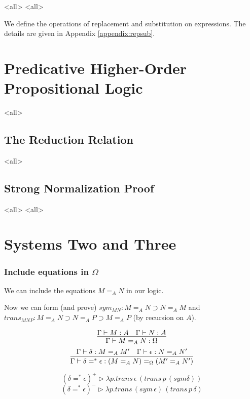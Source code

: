 
\mode<all>{}
\mode<all>{}

We define the operations of replacement and substitution on
expressions.  The details are given in Appendix \ref{appendix:repsub}.








\section{Predicative Higher-Order Propositional Logic}


\mode<all>{}

\subsection{The Reduction Relation}

\mode<all>{}

\subsection{Strong Normalization Proof}

\mode<all>{}
\mode<all>{}

\section{Systems Two and Three}

\begin{frame}
\frametitle{Include equations in $\Omega$}

We can include the equations $M =_A N$ in our logic.

Now we can form (and prove) $sym_{MN} : M =_A N \supset N =_A M$ and $trans_{MNP} : M =_A N \supset N =_A P \supset M =_A P$ (by recursion on $A$).

\pause

\[ \infer{\Gamma \vdash M =_A N : \Omega}{\Gamma \vdash M : A \quad \Gamma \vdash N : A} \]
\[ \infer{\Gamma \vdash \delta =^* \epsilon : (M =_A N) =_\Omega (M' =_A N')}
{\Gamma \vdash \delta : M =_A M' \quad \Gamma \vdash \epsilon : N =_A N'} \]

\pause

\[ (\delta =^* \epsilon)^+ \rhd \lambda p. trans \, \epsilon \, (trans \, p \, (sym \delta)) \]
\[ (\delta =^* \epsilon)^- \rhd \lambda p. trans \, (sym \, \epsilon) \, (trans \, p \, \delta) \]
\end{frame}

